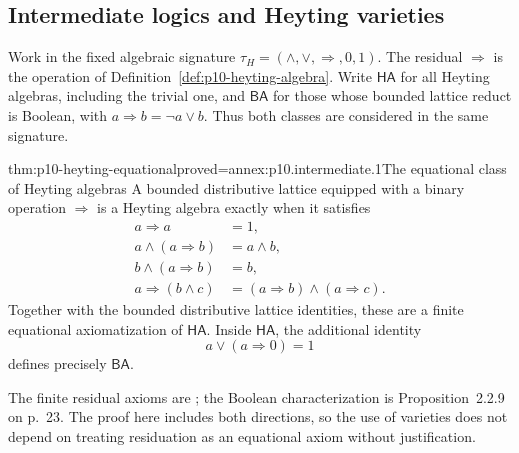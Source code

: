 
\subsection{Intermediate logics and Heyting varieties}
\label{sec:p10-intermediate-algebras}

Work in the fixed algebraic signature
\(\tau_H=(\wedge,\vee,\Rightarrow,0,1)\).
The residual \(\Rightarrow\) is the operation of
Definition~\ref{def:p10-heyting-algebra}.
Write \(\mathsf{HA}\) for all Heyting algebras, including the trivial
one, and \(\mathsf{BA}\) for those whose bounded lattice reduct is
Boolean, with \(a\Rightarrow b=\neg a\vee b\).
Thus both classes are considered in the same signature.

\begin{hbtheorem}{thm:p10-heyting-equational}{proved=annex:p10.intermediate.1}{The equational class of Heyting algebras}
A bounded distributive lattice equipped with a binary operation
\(\Rightarrow\) is a Heyting algebra exactly when it satisfies
\[
\begin{aligned}
 a\Rightarrow a&=1,\\
 a\wedge(a\Rightarrow b)&=a\wedge b,\\
 b\wedge(a\Rightarrow b)&=b,\\
 a\Rightarrow(b\wedge c)&=(a\Rightarrow b)\wedge(a\Rightarrow c).
\end{aligned}
\]
Together with the bounded distributive lattice identities, these
are a finite equational axiomatization of \(\mathsf{HA}\).
Inside \(\mathsf{HA}\), the additional identity
\[
 a\vee(a\Rightarrow0)=1
\]
defines precisely \(\mathsf{BA}\).
\end{hbtheorem}

The finite residual axioms are
\cite[Theorem~2.2.6, pp.~21--22]{Bezhanishvili2006Thesis};
the Boolean characterization is Proposition~2.2.9 on p.~23.
The proof here includes both directions, so the use of varieties does
not depend on treating residuation as an equational axiom without
justification.

